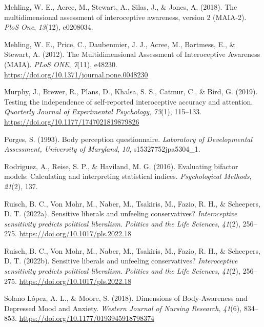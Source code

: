 \documentclass[
  man,
  floatsintext,
  longtable,
  nolmodern,
  notxfonts,
  notimes,
  colorlinks=true,linkcolor=blue,citecolor=blue,urlcolor=blue]{apa7}
\newlength{\cslhangindent}
\newenvironment{CSLReferences}[2] %
 {\begin{list}{}{%
  \setlength{\itemindent}{0pt}
  \setlength{\leftmargin}{0pt}
  \setlength{\parsep}{0pt}
  \ifodd #1
   \setlength{\leftmargin}{\cslhangindent}
   \setlength{\itemindent}{-1\cslhangindent}
  \fi
  \setlength{\itemsep}{#2\baselineskip}}}
 {\end{list}}
\begin{document}
\begin{CSLReferences}{1}{0}
Mehling, W. E., Acree, M., Stewart, A., Silas, J., \& Jones, A. (2018).
The multidimensional assessment of interoceptive awareness, version 2
(MAIA-2). \emph{PloS One}, \emph{13}(12), e0208034.

Mehling, W. E., Price, C., Daubenmier, J. J., Acree, M., Bartmess, E.,
\& Stewart, A. (2012). The Multidimensional Assessment of Interoceptive
Awareness (MAIA). \emph{PLoS ONE}, \emph{7}(11), e48230.
\url{https://doi.org/10.1371/journal.pone.0048230}

Murphy, J., Brewer, R., Plans, D., Khalsa, S. S., Catmur, C., \& Bird,
G. (2019). Testing the independence of self-reported interoceptive
accuracy and attention. \emph{Quarterly Journal of Experimental
Psychology}, \emph{73}(1), 115--133.
\url{https://doi.org/10.1177/1747021819879826}

Porges, S. (1993). Body perception questionnaire. \emph{Laboratory of
Developmental Assessment, University of Maryland}, \emph{10},
s15327752jpa5304\_1.

Rodriguez, A., Reise, S. P., \& Haviland, M. G. (2016). Evaluating
bifactor models: Calculating and interpreting statistical indices.
\emph{Psychological Methods}, \emph{21}(2), 137.

Ruisch, B. C., Von Mohr, M., Naber, M., Tsakiris, M., Fazio, R. H., \&
Scheepers, D. T. (2022a). Sensitive liberals and unfeeling
conservatives? {\emph{Interoceptive sensitivity predicts political
liberalism}}. \emph{Politics and the Life Sciences}, \emph{41}(2),
256--275. \url{https://doi.org/10.1017/pls.2022.18}

Ruisch, B. C., Von Mohr, M., Naber, M., Tsakiris, M., Fazio, R. H., \&
Scheepers, D. T. (2022b). Sensitive liberals and unfeeling
conservatives? {\emph{Interoceptive sensitivity predicts political
liberalism}}. \emph{Politics and the Life Sciences}, \emph{41}(2),
256--275. \url{https://doi.org/10.1017/pls.2022.18}

Solano López, A. L., \& Moore, S. (2018). Dimensions of Body-Awareness
and Depressed Mood and Anxiety. \emph{Western Journal of Nursing
Research}, \emph{41}(6), 834--853.
\url{https://doi.org/10.1177/0193945918798374}


\end{CSLReferences}
\end{document}
